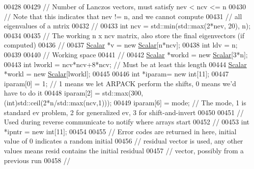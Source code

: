 \begin{DoxyCode}
00428 
00429   \textcolor{comment}{// Number of Lanczos vectors, must satisfy nev < ncv <= n}
00430   \textcolor{comment}{// Note that this indicates that nev != n, and we cannot compute}
00431   \textcolor{comment}{// all eigenvalues of a mtrix}
00432   \textcolor{comment}{//}
00433   \textcolor{keywordtype}{int} ncv = std::min(std::max(2*nev, 20), n);
00434 
00435   \textcolor{comment}{// The working n x ncv matrix, also store the final eigenvectors (if computed)}
00436   \textcolor{comment}{//}
00437   \hyperlink{class_eigen_1_1_arpack_generalized_self_adjoint_eigen_solver_ab1182405bfe87a505d4b7a8311c661ec}{Scalar} *v = \textcolor{keyword}{new} \hyperlink{class_eigen_1_1_arpack_generalized_self_adjoint_eigen_solver_ab1182405bfe87a505d4b7a8311c661ec}{Scalar}[n*ncv];
00438   \textcolor{keywordtype}{int} ldv = n;
00439 
00440   \textcolor{comment}{// Working space}
00441   \textcolor{comment}{//}
00442   \hyperlink{class_eigen_1_1_arpack_generalized_self_adjoint_eigen_solver_ab1182405bfe87a505d4b7a8311c661ec}{Scalar} *workd = \textcolor{keyword}{new} \hyperlink{class_eigen_1_1_arpack_generalized_self_adjoint_eigen_solver_ab1182405bfe87a505d4b7a8311c661ec}{Scalar}[3*n];
00443   \textcolor{keywordtype}{int} lworkl = ncv*ncv+8*ncv; \textcolor{comment}{// Must be at least this length}
00444   \hyperlink{class_eigen_1_1_arpack_generalized_self_adjoint_eigen_solver_ab1182405bfe87a505d4b7a8311c661ec}{Scalar} *workl = \textcolor{keyword}{new} \hyperlink{class_eigen_1_1_arpack_generalized_self_adjoint_eigen_solver_ab1182405bfe87a505d4b7a8311c661ec}{Scalar}[lworkl];
00445 
00446   \textcolor{keywordtype}{int} *iparam= \textcolor{keyword}{new} \textcolor{keywordtype}{int}[11];
00447   iparam[0] = 1; \textcolor{comment}{// 1 means we let ARPACK perform the shifts, 0 means we'd have to do it}
00448   iparam[2] = std::max(300, (\textcolor{keywordtype}{int})std::ceil(2*n/std::max(ncv,1)));
00449   iparam[6] = mode; \textcolor{comment}{// The mode, 1 is standard ev problem, 2 for generalized ev, 3 for shift-and-invert}
00450 
00451   \textcolor{comment}{// Used during reverse communicate to notify where arrays start}
00452   \textcolor{comment}{//}
00453   \textcolor{keywordtype}{int} *ipntr = \textcolor{keyword}{new} \textcolor{keywordtype}{int}[11]; 
00454 
00455   \textcolor{comment}{// Error codes are returned in here, initial value of 0 indicates a random initial}
00456   \textcolor{comment}{// residual vector is used, any other values means resid contains the initial residual}
00457   \textcolor{comment}{// vector, possibly from a previous run}
00458   \textcolor{comment}{//}

\end{DoxyCode}

